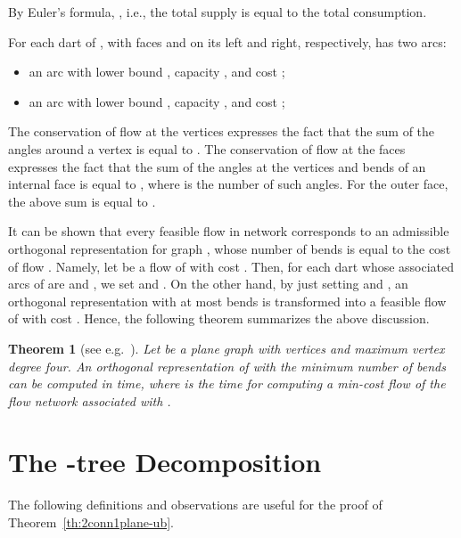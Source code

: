 \documentclass{article}
\newtheorem{theorem}{Theorem}
\begin{document}
By Euler's formula, , i.e., the total supply is equal to the total consumption.

\noindent For each dart  of , with faces  and  on its left and right, respectively,  has two arcs:
\begin{itemize}
    \item an arc  with lower bound , capacity , and cost ;
    \item an arc  with lower bound , capacity , and cost ;
\end{itemize}

The conservation of flow at the vertices expresses the fact that the sum of the angles around a vertex is equal to .  The conservation of flow at the faces expresses the fact that the sum of the angles at the vertices and bends of an internal face is equal to , where  is the number of such angles.  For the outer face, the above sum is equal to .

It can be shown that every feasible flow  in network  corresponds to an admissible orthogonal representation for graph , whose number of bends is equal to the cost of flow .  Namely, let  be a flow of  with cost . Then, for each dart   whose associated arcs of  are  and , we set  and . On the other hand, by just setting  and , an orthogonal representation  with at most  bends is transformed into a feasible flow  of  with cost . Hence, the following theorem summarizes the above discussion.

\begin{theorem}[see e.g.~\cite{dett-gdavg-99}]
Let  be a plane graph with  vertices and maximum vertex degree four. An orthogonal representation  of  with the minimum number of bends can be computed in  time, where  is the time for computing a min-cost flow of the flow network  associated with .
\end{theorem}

\section{The -tree Decomposition}\label{ap:spqrtree}

The following definitions and observations are useful for the proof of Theorem~\ref{th:2conn1plane-ub}.
\end{document}
